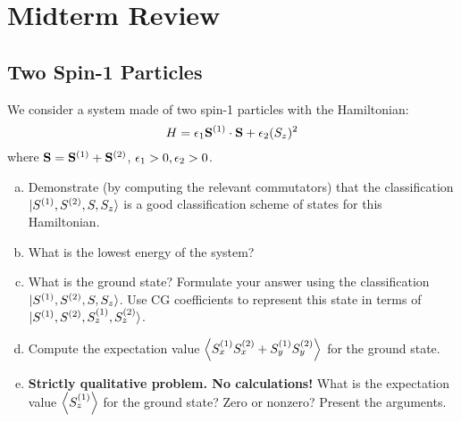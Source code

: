 \section{Midterm Review}

\subsection{Two Spin-1 Particles}
We consider a system made of two spin-1 particles with the Hamiltonian:
\begin{equation}
    H = \epsilon_1 \mathbf{S}^{(1)} \cdot \mathbf{S} + \epsilon_2(S_z)^2
\end{equation}
where $\mathbf{S} = \mathbf{S}^{(1)} + \mathbf{S}^{(2)}$, $\epsilon_1 > 0, \epsilon_2 > 0$. 

\begin{enumerate}[(a)]
    \item Demonstrate (by computing the relevant commutators) that the classification $\lvert S^{(1)}, S^{(2)}, S, S_z \rangle$ is a good classification scheme of states for this Hamiltonian.
    \item What is the lowest energy of the system?
    \item What is the ground state? Formulate your answer using the classification $\lvert S^{(1)}, S^{(2)}, S, S_z \rangle$. Use CG coefficients to represent this state in terms of $\lvert S^{(1)}, S^{(2)}, S_z^{(1)}, S_z^{(2)} \rangle$. 
    \item Compute the expectation value $\left< S_x^{(1)}S_x^{(2)} + S_y^{(1)}S_y^{(2)} \right>$ for the ground state.
    \item \textbf{Strictly qualitative problem. No calculations!} What is the expectation value $\left< S_z^{(1)} \right>$ for the ground state? Zero or nonzero? Present the arguments.
\end{enumerate}

